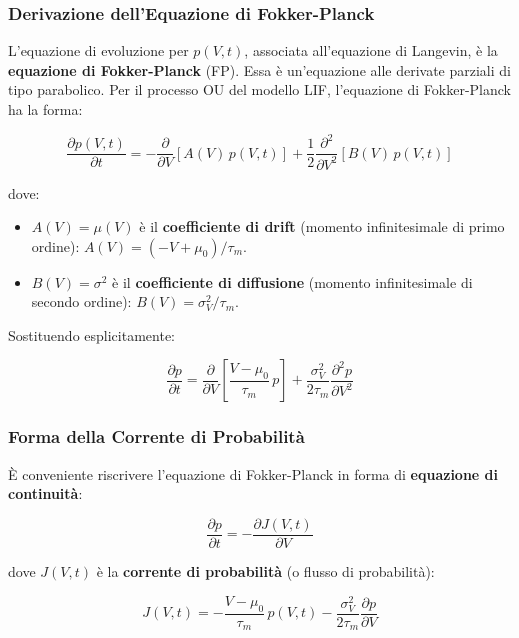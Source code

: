 \subsubsection{Derivazione dell'Equazione di Fokker-Planck}

L'equazione di evoluzione per $p(V, t)$, associata all'equazione di Langevin, è la \textbf{equazione di Fokker-Planck} (FP). Essa è un'equazione alle derivate parziali di tipo parabolico. Per il processo OU del modello LIF, l'equazione di Fokker-Planck ha la forma:

\begin{equation}
\frac{\partial p(V, t)}{\partial t} = -\frac{\partial}{\partial V}\left[A(V)\, p(V, t)\right] + \frac{1}{2}\frac{\partial^2}{\partial V^2}\left[B(V)\, p(V, t)\right]
\end{equation}

dove:
\begin{itemize}
    \item $A(V) = \mu(V)$ è il \textbf{coefficiente di drift} (momento infinitesimale di primo ordine): $A(V) = (-V + \mu_0)/\tau_m$.
    \item $B(V) = \sigma^2$ è il \textbf{coefficiente di diffusione} (momento infinitesimale di secondo ordine): $B(V) = \sigma_V^2/\tau_m$.
\end{itemize}

Sostituendo esplicitamente:

\begin{equation}
\frac{\partial p}{\partial t} = \frac{\partial}{\partial V}\left[\frac{V - \mu_0}{\tau_m}\, p\right] + \frac{\sigma_V^2}{2\tau_m}\frac{\partial^2 p}{\partial V^2}
\end{equation}

\subsubsection{Forma della Corrente di Probabilità}

È conveniente riscrivere l'equazione di Fokker-Planck in forma di \textbf{equazione di continuità}:

\begin{equation}
\frac{\partial p}{\partial t} = -\frac{\partial J(V, t)}{\partial V}
\end{equation}

dove $J(V, t)$ è la \textbf{corrente di probabilità} (o flusso di probabilità):

\begin{equation}
J(V, t) = -\frac{V - \mu_0}{\tau_m}\, p(V, t) - \frac{\sigma_V^2}{2\tau_m}\frac{\partial p}{\partial V}
\end{equation}


